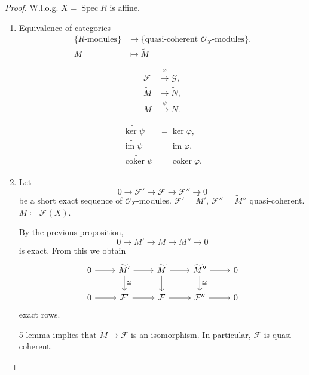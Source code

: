 \documentclass[12pt]{article}
\DeclareMathOperator{\im}{im}
\DeclareMathOperator{\coker}{coker}
\DeclareMathOperator{\Spec}{Spec}
\theoremstyle{definition}
\theoremstyle{remark}
\begin{document}
\begin{proof}
W.l.o.g. $X=\Spec R$ is affine.
\begin{enumerate}[label=\arabic*)]
\item Equivalence of categories
\begin{align*}
\{R\text{-modules}\}&\longrightarrow\{\text{quasi-coherent }\mathcal{O}_X\text{-modules}\}.\\
M&\longmapsto\widetilde{M}
\end{align*}

\begin{align*}
\mathcal{F}&\overset{\varphi}{\longrightarrow}\mathcal{G},\\
\widetilde{M}&\longrightarrow\widetilde{N},\\
M&\overset{\psi}{\longrightarrow}N.
\end{align*}

\begin{align*}
\widetilde{\ker\psi}&=\ker\varphi,\\
\widetilde{\im\psi}&=\im\varphi,\\
\widetilde{\coker\psi}&=\coker\varphi.
\end{align*}

\item Let
\[0\longrightarrow\mathcal{F}'\longrightarrow\mathcal{F}\longrightarrow\mathcal{F}''\longrightarrow0\]
be a short exact sequence of $\mathcal{O}_X$-modules. $\mathcal{F}'=\widetilde{M}'$, $\mathcal{F}''=\widetilde{M}''$ quasi-coherent. $M\coloneqq\mathcal{F}(X)$.

By the previous proposition,
\[0\longrightarrow M'\longrightarrow M\longrightarrow M''\longrightarrow0\]
is exact. From this we obtain
\[
\begin{tikzcd}
0\arrow[r]&\widetilde{M}'\arrow[r]\arrow[d,"\cong"]&\widetilde{M}\arrow[r]\arrow[d]&\widetilde{M}''\arrow[r]\arrow[d,"\cong"]&0\\
0\arrow[r]&\mathcal{F}'\arrow[r]&\mathcal{F}\arrow[r]&\mathcal{F}''\arrow[r]&0
\end{tikzcd}
\]
exact rows.

5-lemma implies that $\widetilde{M}\rightarrow\mathcal{F}$ is an isomorphism. In particular, $\mathcal{F}$ is quasi-coherent.
\end{enumerate}
\end{proof}
\end{document}
